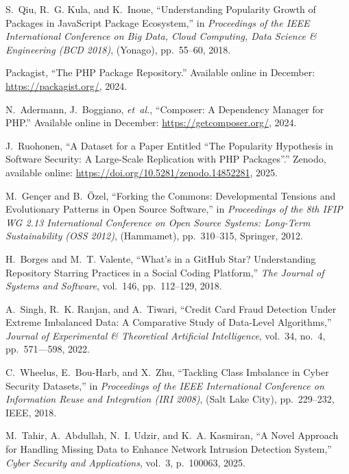 \documentclass[5p, twocolumn, numbers, sort]{elsarticle}
\begin{document}
\begin{thebibliography}{10}
S.~Qiu, R.~G. Kula, and K.~Inoue, ``{U}nderstanding {P}opularity {G}rowth of
  {P}ackages in {J}ava{S}cript {P}ackage {E}cosystem,'' in {\em Proceedings of
  the IEEE International Conference on Big Data, Cloud Computing, Data Science
  \& Engineering (BCD 2018)}, (Yonago), pp.~55--60, 2018.

{P}ackagist, ``{T}he {PHP} {P}ackage {R}epository.'' {A}vailable online in
  December: \url{https://packagist.org/}, 2024.

N.~Adermann, J.~Boggiano, {\em et~al.}, ``{C}omposer: {A} {D}ependency
  {M}anager for {PHP}.'' {A}vailable online in December:
  \url{https://getcomposer.org/}, 2024.

J.~Ruohonen, ``{A} {D}ataset for a {P}aper {E}ntitled ``{T}he {P}opularity
  {H}ypothesis in {S}oftware {S}ecurity: {A} {L}arge-{S}cale {R}eplication with
  {PHP} {P}ackages''.'' Zenodo, available online:
  \url{https://doi.org/10.5281/zenodo.14852281}, 2025.

M.~Gen\c{c}er and B.~\"Ozel, ``{F}orking the {C}ommons: {D}evelopmental
  {T}ensions and {E}volutionary {P}atterns in {O}pen {S}ource {S}oftware,'' in
  {\em Proceedings of the 8th IFIP WG 2.13 International Conference on Open
  Source Systems: Long-Term Sustainability (OSS 2012)}, (Hammamet),
  pp.~310--315, Springer, 2012.

H.~Borges and M.~T. Valente, ``{W}hat's in a {G}it{H}ub {S}tar? {U}nderstanding
  {R}epository {S}tarring {P}ractices in a {S}ocial {C}oding {P}latform,'' {\em
  The Journal of Systems and Software}, vol.~146, pp.~112--129, 2018.

A.~Singh, R.~K. Ranjan, and A.~Tiwari, ``{C}redit {C}ard {F}raud {D}etection
  {U}nder {E}xtreme {I}mbalanced {D}ata: {A} {C}omparative {S}tudy of
  {D}ata-{L}evel {A}lgorithms,'' {\em Journal of Experimental \& Theoretical
  Artificial Intelligence}, vol.~34, no.~4, pp.~571---598, 2022.

C.~Wheelus, E.~Bou-Harb, and X.~Zhu, ``{T}ackling {C}lass {I}mbalance in
  {C}yber {S}ecurity {D}atasets,'' in {\em Proceedings of the IEEE
  International Conference on Information Reuse and Integration (IRI 2008)},
  (Salt Lake City), pp.~229--232, IEEE, 2018.

M.~Tahir, A.~Abdullah, N.~I. Udzir, and K.~A. Kasmiran, ``{A} {N}ovel
  {A}pproach for {H}andling {M}issing {D}ata to {E}nhance {N}etwork {I}ntrusion
  {D}etection {S}ystem,'' {\em Cyber Security and Applications}, vol.~3,
  p.~100063, 2025.


\end{thebibliography}
\end{document}

